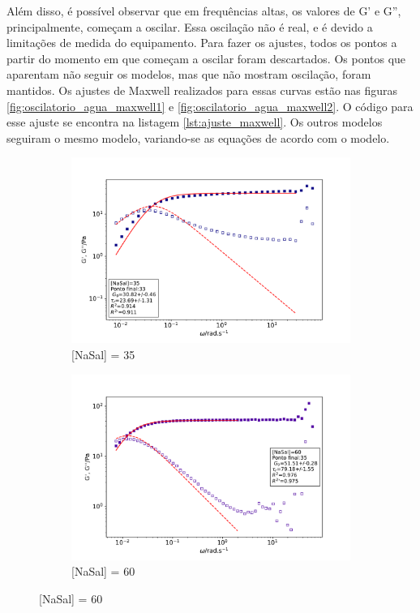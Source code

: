 		Além disso, é possível observar que em frequências altas, os valores de G' e G'', principalmente, começam a oscilar. Essa oscilação não é real, e é devido a limitações de medida do equipamento. Para fazer os ajustes, todos os pontos a partir do momento em que começam a oscilar foram descartados. Os pontos que aparentam não seguir os modelos, mas que não mostram oscilação, foram mantidos. Os ajustes de Maxwell realizados para essas curvas estão nas figuras \ref{fig:oscilatorio_agua_maxwell1} e \ref{fig:oscilatorio_agua_maxwell2}. O código para esse ajuste se encontra na listagem \ref{lst:ajuste_maxwell}. Os outros modelos seguiram o mesmo modelo, variando-se as equações de acordo com o modelo.
		
		\begin{figure}[h]
			\begin{subfigure}[t]{0.5\textwidth}
				\includegraphics[width=\textwidth]{imagens/reologia/oscilatorio_agua_35}
				\caption{[NaSal] = 35\mM}
				\label{fig:oscilatorio_agua_35}
			\end{subfigure} %
			\begin{subfigure}[t]{0.5\textwidth}
				\centering
				\includegraphics[width=\textwidth]{imagens/reologia/oscilatorio_agua_60}
				\caption{[NaSal] = 60\mM}
				\label{fig:oscilatorio_agua_60}
			\end{subfigure}
			

\end{figure}
